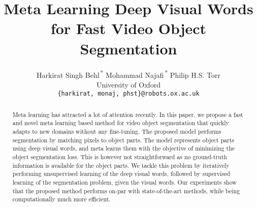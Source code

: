 \documentclass[10pt,twocolumn,letterpaper]{article}
\begin{document}
\title{Meta Learning Deep Visual Words for Fast Video Object Segmentation}

\author{Harkirat Singh Behl\textsuperscript{\,*}
\qquad
Mohammad Najafi\textsuperscript{\,*}
\qquad
Philip H.S. Torr\\
University of Oxford\\
{\tt\small \{harkirat, monaj, phst\}@robots.ox.ac.uk}
}


\let\thefootnote\relax{}
\begin{abstract}
\vspace{-0.15in}
Meta learning has attracted a lot of attention recently. In this paper, we propose a fast and novel meta learning based method for video object segmentation that quickly adapts to new domains without any fine-tuning. The proposed model performs segmentation by matching pixels to object parts. The model represents object parts using deep visual words, and meta learns them with the objective of minimizing the object segmentation loss. This is however not straightforward as no ground-truth information is available for the object parts. We tackle this problem by iteratively performing unsupervised learning of the deep visual words, followed by supervised learning of the segmentation problem, given the visual words. Our experiments show that the proposed method performs on-par with state-of-the-art methods, while being computationally much more efficient.

\end{abstract}
\end{document}
